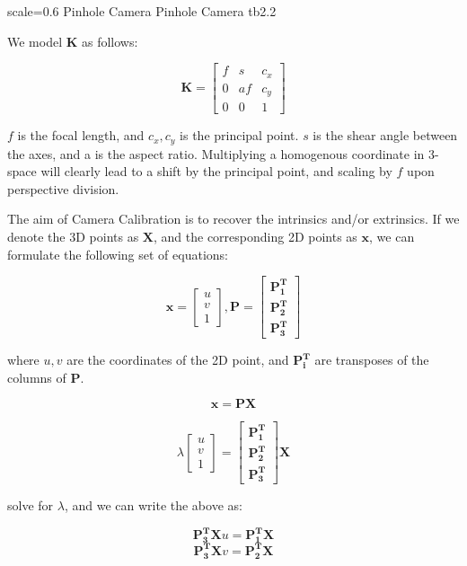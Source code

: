 {scale=0.6}%
{Pinhole Camera}%
{Pinhole Camera}%
{tb2.2}

We model \textbf{K} as follows:

\[\mathbf{K} = \begin{bmatrix}
f & s & c_x\\
0 & af & c_y\\
0 & 0 & 1
\end{bmatrix}\]

$f$ is the focal length, and $c_x, c_y$ is the principal point. $s$ is the shear angle between the axes, and a is the aspect ratio. Multiplying a homogenous coordinate in 3-space will clearly lead to a shift by the principal point, and scaling by $f$ upon perspective division. 

The aim of Camera Calibration is to recover the intrinsics and/or extrinsics. If we denote the 3D points as $\mathbf{X}$, and the corresponding 2D points as $\mathbf{x}$, we can formulate the following set of equations:

\[\mathbf{x}=\begin{bmatrix}
u\\
v\\
1\end{bmatrix}, \mathbf{P} = \begin{bmatrix}
\mathbf{P_1^T}\\
\mathbf{P_2^T}\\
\mathbf{P_3^T}\end{bmatrix} \]

where $u, v$ are the coordinates of the 2D point, and $\mathbf{P_i^T}$ are transposes of the columns of $\mathbf{P}$. 

\[\mathbf{x} = \mathbf{PX}\]

\[\lambda\begin{bmatrix}
u\\
v\\
1\end{bmatrix} = \begin{bmatrix}
\mathbf{P_1^T}\\
\mathbf{P_2^T}\\
\mathbf{P_3^T}\end{bmatrix}\mathbf{X}\]

solve for $\lambda$, and we can write the above as:

\[\mathbf{P_3^TX}u = \mathbf{P_1^TX}\]
\[\mathbf{P_3^TX}v = \mathbf{P_2^TX}\]

